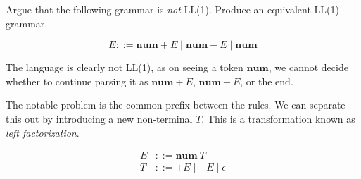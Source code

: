 

  



\begin{exercise}{}
  Argue that the following grammar is \emph{not} LL(1). Produce an equivalent
  LL(1) grammar.

  \begin{equation*}
    E ::= \mathbf{num} + E \mid \mathbf{num} - E \mid \mathbf{num}
  \end{equation*}

  \begin{solution}
    The language is clearly not LL(1), as on seeing a token \(\mathbf{num}\), we
    cannot decide whether to continue parsing it as \(\mathbf{num} + E\),
    \(\mathbf{num} - E\), or the end. 

    The notable problem is the common prefix between the rules. We can separate
    this out by introducing a new non-terminal \(T\). This is a transformation
    known as \emph{left factorization}.

    \begin{align*}
      E &::= \mathbf{num} ~T \\
      T &::= + E \mid - E \mid \epsilon
    \end{align*}


  \end{solution}
\end{exercise}

